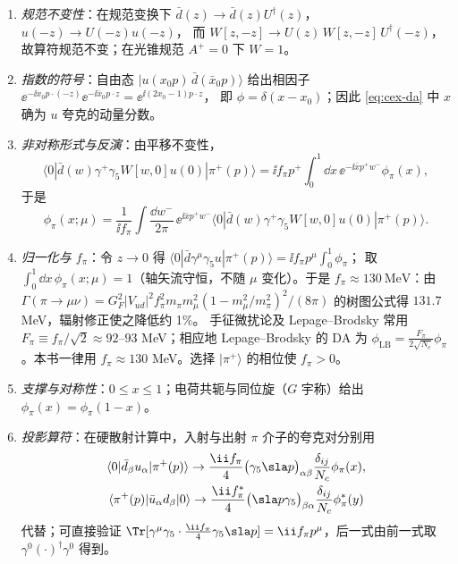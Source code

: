 \begin{remark}[约定的逐项说明]\label{rem:cex-da-conv}
\begin{enumerate}[label=(\roman*)]
\item \emph{规范不变性}：在规范变换下 $\bar d(z)\to\bar d(z)U^\dagger(z)$，$u(-z)\to U(-z)u(-z)$，
而 $W[z,-z]\to U(z)\,W[z,-z]\,U^\dagger(-z)$，故算符规范不变；在光锥规范 $A^+=0$ 下 $W=1$。
\item \emph{指数的符号}：自由态 $|u(x_0p)\,\bar d(\bar x_0p)\rangle$ 给出相因子 $\ee^{-\ii x_0p\cdot(-z)}\ee^{-\ii\bar x_0p\cdot z}=\ee^{\ii(2x_0-1)p\cdot z}$，
即 $\phi=\delta(x-x_0)$；因此 \cref{eq:cex-da} 中 $x$ 确为 $u$ 夸克的动量分数。
\item \emph{非对称形式与反演}：由平移不变性，
\begin{equation*}
\langle0|\bar d(w)\gamma^+\gamma_5W[w,0]u(0)|\pi^+(p)\rangle=\ii f_\pi p^+\int_0^1\dd x\,\ee^{-\ii\bar xp^+w^-}\phi_\pi(x),
\end{equation*}
于是
\begin{equation}\label{eq:cex-da-inv}
\phi_\pi(x;\mu)=\frac{1}{\ii f_\pi}\int\frac{\dd w^-}{2\pi}\,\ee^{\ii\bar x p^+w^-}\langle0|\bar d(w)\gamma^+\gamma_5W[w,0]u(0)|\pi^+(p)\rangle .
\end{equation}
\item \emph{归一化与 $f_\pi$}：令 $z\to0$ 得 $\langle0|\bar d\gamma^\mu\gamma_5u|\pi^+(p)\rangle=\ii f_\pi p^\mu\int_0^1\phi_\pi$；
取 $\int_0^1\dd x\,\phi_\pi(x;\mu)=1$（轴矢流守恒，不随 $\mu$ 变化）。于是 $f_\pi\approx130\ \mathrm{MeV}$：由
$\Gamma(\pi\to\mu\nu)=G_F^2|V_{ud}|^2f_\pi^2m_\pi m_\mu^2(1-m_\mu^2/m_\pi^2)^2/(8\pi)$ 的树图公式得 $131.7$ MeV，辐射修正使之降低约 1\%。
手征微扰论及 Lepage--Brodsky 常用 $F_\pi\equiv f_\pi/\sqrt2\approx92$--$93$ MeV；相应地 Lepage--Brodsky 的 DA 为
$\phi_{\mathrm{LB}}=\frac{F_\pi}{2\sqrt{N_c}}\phi_\pi$。本书一律用 $f_\pi\approx130$ MeV。选择 $|\pi^+\rangle$ 的相位使 $f_\pi>0$。
\item \emph{支撑与对称性}：$0\le x\le1$；电荷共轭与同位旋（$G$ 宇称）给出 $\phi_\pi(x)=\phi_\pi(1-x)$。
\item \emph{投影算符}：在硬散射计算中，入射与出射 $\pi$ 介子的夸克对分别用
\begin{equation}\label{eq:cex-proj}
\begin{gathered}
\langle0|\bar d_\beta u_\alpha|\pi^+(p)\rangle\to\frac{\ii f_\pi}{4}\big(\gamma_5\sla p\big)_{\alpha\beta}\frac{\delta_{ij}}{N_c}\phi_\pi(x),\\
\langle\pi^+(p)|\bar u_\alpha d_\beta|0\rangle\to\frac{\ii f_\pi^*}{4}\big(\sla p\gamma_5\big)_{\beta\alpha}\frac{\delta_{ij}}{N_c}\phi^*_\pi(y)
\end{gathered}
\end{equation}
代替；可直接验证 $\Tr[\gamma^\mu\gamma_5\cdot\frac{\ii f_\pi}4\gamma_5\sla p]=\ii f_\pi p^\mu$，后一式由前一式取 $\gamma^0(\cdot)^\dagger\gamma^0$ 得到。
\end{enumerate}
\end{remark}

